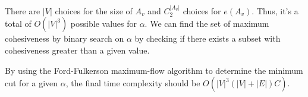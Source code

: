 
There are $|V|$ choices for the size of $A_v$ and $C_{2}^{|A_v|}$ choices for $e(A_v)$. Thus, it's a total of $O(|V|^3)$ possible values for $\alpha$. We can find the set of maximum cohesiveness by binary search on $\alpha$ by checking if there exists a subset with cohesiveness greater than a given value.



By using the Ford-Fulkerson maximum-flow algorithm to determine the minimum cut for a given $\alpha$, the final time complexity should be $O(|V|^3 (|V|+|E|) C)$.

